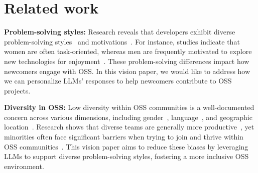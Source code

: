 \section{Related work}
\label{sec:backrelated}

\textbf{Problem-solving styles:} Research reveals that developers exhibit diverse problem-solving styles~\cite{burnett2016gendermag} and motivations~\cite{gerosa2021shifting}. For instance, studies indicate that women are often task-oriented, whereas men are frequently motivated to explore new technologies for enjoyment~\cite{padala2020gender, mendez2018open, mendez2018gender}. These problem-solving differences impact how newcomers engage with OSS. In this vision paper, we would like to address how we can personalize LLMs' responses to help newcomers contribute to OSS projects.

\textbf{Diversity in OSS:} Low diversity within OSS communities is a well-documented concern across various dimensions, including gender~\cite{trinkenreich2021women, guizani2022debug, bosu2019diversity, terrell2016gender}, language~\cite{storey2016social}, and geographic location~\cite{storey2016social}. Research shows that diverse teams are generally more productive~\cite{vasilescu2015gender}, yet minorities often face significant barriers when trying to join and thrive within OSS communities~\cite{trinkenreich2021women}. %
This vision paper aims to reduce these biases by leveraging LLMs to support diverse problem-solving styles, fostering a more inclusive OSS environment.
